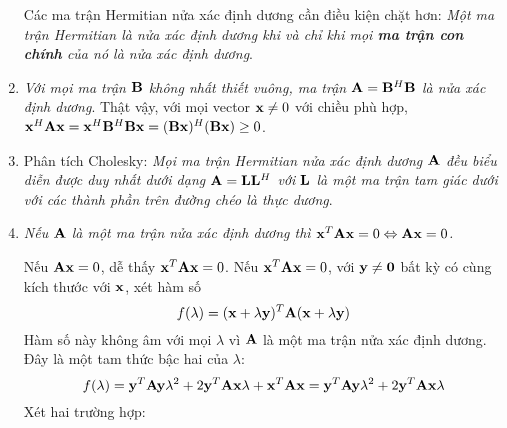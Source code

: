 \begin{enumerate}
Các ma trận Hermitian nửa xác định dương cần điều kiện chặt hơn: \textit{Một
ma trận Hermitian là nửa xác định dương khi và chỉ khi mọi \textbf{ma trận
con chính} của nó là nửa xác định dương}.





\item \textit{Với mọi ma trận $\mathbf{B}$ không nhất thiết vuông, ma trận $\mathbf{A} = \mathbf{B}^H\mathbf{B}$ là nửa xác định dương}.
Thật vậy, với mọi vector $\mathbf{x} \neq 0$ với chiều phù hợp, $\mathbf{x}^H\mathbf{A}\mathbf{x} =
\mathbf{x}^H\mathbf{B}^H\mathbf{B}\mathbf{x} = (\mathbf{B}\mathbf{x})^H(\mathbf{B}\mathbf{x}) \geq 0$.
\item Phân tích Cholesky: \textit{Mọi ma trận Hermitian nửa xác định dương
$\mathbf{A}$ đều biểu diễn được duy nhất dưới dạng $\mathbf{A} = \mathbf{L}\mathbf{L}^H$ với $\mathbf{L}$ là
một ma trận tam giác dưới với các thành phần trên đường chéo là thực dương}.

\item \textit{Nếu $\mathbf{A}$ là một ma trận nửa xác định dương thì
$\mathbf{x}^T\mathbf{A}\mathbf{x} = 0 \Leftrightarrow \mathbf{A}\mathbf{x} = 0$.}

Nếu $\mathbf{A}\mathbf{x} = 0$, dễ thấy $\mathbf{x}^T\mathbf{A}\mathbf{x} = 0$. Nếu $\mathbf{x}^T\mathbf{A}\mathbf{x} = 0$, với $\mathbf{y} \neq \mathbf{0}$ bất kỳ có cùng kích thước với $\mathbf{x}$, xét hàm số
\begin{equation}
f(\lambda) = (\mathbf{x} + \lambda \mathbf{y})^T\mathbf{A}(\mathbf{x} + \lambda\mathbf{y})
\end{equation}
Hàm số này không âm với mọi $\lambda$ vì $\mathbf{A}$ là một ma trận nửa xác định
dương. Đây là một tam thức bậc hai của $\lambda$:
\begin{equation}
f(\lambda) = \mathbf{y}^T\mathbf{A}\mathbf{y} \lambda^2 + 2\mathbf{y}^T\mathbf{A}\mathbf{x} \lambda + \mathbf{x}^T\mathbf{A}\mathbf{x}
= \mathbf{y}^T\mathbf{A}\mathbf{y} \lambda^2 + 2\mathbf{y}^T\mathbf{A}\mathbf{x} \lambda
\end{equation}
Xét hai trường hợp:
\begin{itemize}


\end{itemize}
\end{enumerate}
